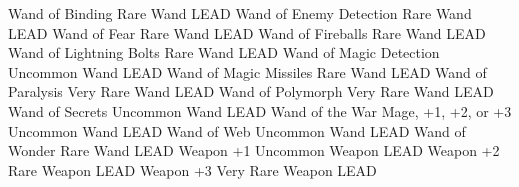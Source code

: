 Wand of Binding	Rare	Wand	LEAD
Wand of Enemy Detection	Rare	Wand	LEAD
Wand of Fear	Rare	Wand	LEAD
Wand of Fireballs	Rare	Wand	LEAD
Wand of Lightning Bolts	Rare	Wand	LEAD
Wand of Magic Detection	Uncommon	Wand	LEAD
Wand of Magic Missiles	Rare	Wand	LEAD
Wand of Paralysis	Very Rare	Wand	LEAD
Wand of Polymorph	Very Rare	Wand	LEAD
Wand of Secrets	Uncommon	Wand	LEAD
Wand of the War Mage, +1, +2, or +3	Uncommon	Wand	LEAD
Wand of Web	Uncommon	Wand	LEAD
Wand of Wonder	Rare	Wand	LEAD
Weapon +1	Uncommon	Weapon	LEAD
Weapon +2   Rare        Weapon  LEAD
Weapon +3   Very Rare   Weapon  LEAD
